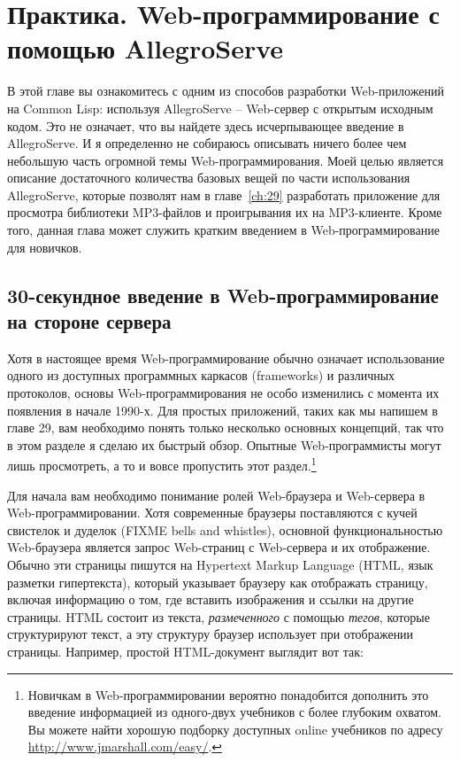 \chapter{Практика. Web-программирование с помощью AllegroServe}
\label{ch:26}

В этой главе вы ознакомитесь с одним из способов разработки Web-приложений на Common Lisp:
используя AllegroServe -- Web-сервер с открытым исходным кодом. Это не означает, что вы
найдете здесь исчерпывающее введение в AllegroServe. И я определенно не собираюсь
описывать ничего более чем небольшую часть огромной темы Web-программирования. Моей целью
является описание достаточного количества базовых вещей по части использования
AllegroServe, которые позволят нам в главе~\ref{ch:29} разработать приложение для
просмотра библиотеки MP3-файлов и проигрывания их на MP3-клиенте. Кроме того, данная глава
может служить кратким введением в Web-программирование для новичков.

\section{30-секундное введение в Web-программирование на стороне сервера}

Хотя в настоящее время Web-программирование обычно означает использование одного из
доступных программных каркасов (frameworks) и различных протоколов, основы
Web-программирования не особо изменились с момента их появления в начале 1990-х. Для
простых приложений, таких как мы напишем в главе 29, вам необходимо понять только
несколько основных концепций, так что в этом разделе я сделаю их быстрый обзор. Опытные
Web-программисты могут лишь просмотреть, а то и вовсе пропустить этот
раздел.\footnote{Новичкам в Web-программировании вероятно понадобится дополнить это
  введение информацией из одного-двух учебников с более глубоким охватом. Вы можете найти
  хорошую подборку доступных online учебников по адресу
  \url{http://www.jmarshall.com/easy/}.}

Для начала вам необходимо понимание ролей Web-браузера и Web-сервера в
Web-программировании. Хотя современные браузеры поставляются с кучей свистелок и дуделок
(FIXME bells and whistles), основной функциональностью Web-браузера является запрос
Web-страниц с Web-сервера и их отображение. Обычно эти страницы пишутся на Hypertext
Markup Language (HTML, язык разметки гипертекста), который указывает браузеру как
отображать страницу, включая информацию о том, где вставить изображения и ссылки на другие
страницы. HTML состоит из текста, \textit{размеченного} с помощью \textit{тегов}, которые
структурируют текст, а эту структуру браузер использует при отображении
страницы. Например, простой HTML-документ выглядит вот так:


